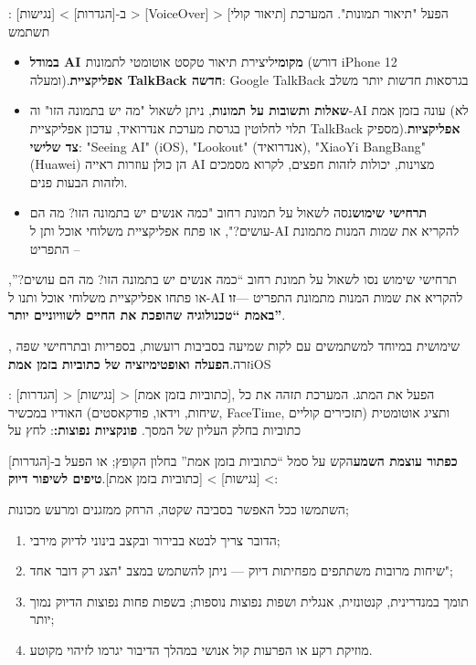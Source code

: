 \begin{tcbinfo}{: ב-[הגדרות] > [נגישות] > [VoiceOver] > [תיאור קולי] הפעל "תיאור תמונות". המערכת תשתמש}
\begin{itemize}
  \item \textbf{במודל AI מקומי}ליצירת תיאור טקסט אוטומטי לתמונות (דורש iPhone 12 ומעלה).\textbf{אפליקציית TalkBack חדשה}: Google TalkBack בגרסאות חדשות יותר משלב
  \item \textbf{שאלות ותשובות על תמונות}, ניתן לשאול "מה יש בתמונה הזו" וה-AI עונה בזמן אמת (לא תלוי לחלוטין בגרסת מערכת אנדרואיד, עדכון אפליקציית TalkBack מספיק).\textbf{אפליקציות צד שלישי}: "Seeing AI" (iOS), "Lookout" (אנדרואיד), "XiaoYi BangBang" (Huawei) הן כולן עוזרות ראייה AI מצוינות, יכולות לזהות חפצים, לקרוא מסמכים ולזהות הבעות פנים.
  \item \textbf{תרחישי שימוש}נסה לשאול על תמונת רחוב "כמה אנשים יש בתמונה הזו? מה הם עושים?", או פתח אפליקציית משלוחי אוכל ותן ל-AI להקריא את שמות המנות מתמונת התפריט –
\end{itemize}

\end{tcbinfo}

\begin{tcbpractice}{תרחישי שימוש}
נסו לשאול על תמונת רחוב “כמה אנשים יש בתמונה הזו? מה הם עושים?”, או פתחו אפליקציית משלוחי אוכל ותנו ל-AI להקריא את שמות המנות מתמונת התפריט —\textbf{זו באמת “טכנולוגיה שהופכת את החיים לשוויוניים יותר”}.

\end{tcbpractice}


, שימושית במיוחד למשתמשים עם לקות שמיעה בסביבות רועשות, בספריות ובתרחישי שפה זרה.\textbf{הפעלה ואופטימיזציה של כתוביות בזמן אמת}iOS

\begin{tcbinfo}{: [הגדרות] > [נגישות] > [כתוביות בזמן אמת], הפעל את המתג. המערכת תזהה את כל האודיו במכשיר (שיחות, וידאו, פודקאסטים, FaceTime, תזכירים קוליים) ותציג אוטומטית כתוביות בחלק העליון של המסך.}
\textbf{פונקציות נפוצות:}: לחץ על

\textbf{כפתור עוצמת השמע}הקש על סמל “כתוביות בזמן אמת” בחלון הקופץ; או הפעל ב-[הגדרות] > [נגישות] > [כתוביות בזמן אמת].\textbf{טיפים לשיפור דיוק}:

השתמשו ככל האפשר בסביבה שקטה, הרחק ממזגנים ומרעש מכונות;

\begin{enumerate}
  \item הדובר צריך לבטא בבירור ובקצב בינוני לדיוק מירבי;
  \item שיחות מרובות משתתפים מפחיתות דיוק — ניתן להשתמש במצב "הצג רק דובר אחד";
  \item תומך במנדרינית, קנטונזית, אנגלית ושפות נפוצות נוספות; בשפות פחות נפוצות הדיוק נמוך יותר;
  \item מוזיקת רקע או הפרעות קול אנושי במהלך הדיבור יגרמו לזיהוי מקוטע.
\end{enumerate}

\end{tcbinfo}

